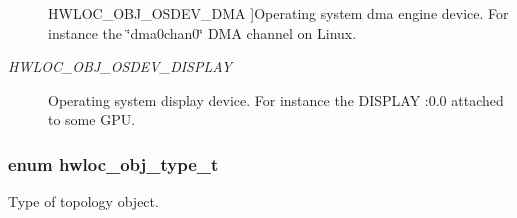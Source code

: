 \begin{Desc}
\begin{description}
{\hypertarget{a00041_gga64f5d539df299c97ae80ce53fc4b56c0a827ad1643360711a8b6c6af671366791}{
HWLOC\_\-OBJ\_\-OSDEV\_\-DMA}
\label{a00041_gga64f5d539df299c97ae80ce53fc4b56c0a827ad1643360711a8b6c6af671366791}
}]Operating system dma engine device. For instance the \char`\"{}dma0chan0\char`\"{} DMA channel on Linux. \item[{\em 
\hypertarget{a00041_gga64f5d539df299c97ae80ce53fc4b56c0a5da1cc266d3d288fdc639b0e800e9da4}{
HWLOC\_\-OBJ\_\-OSDEV\_\-DISPLAY}
\label{a00041_gga64f5d539df299c97ae80ce53fc4b56c0a5da1cc266d3d288fdc639b0e800e9da4}
}]Operating system display device. For instance the DISPLAY :0.0 attached to some GPU. \end{description}
\end{Desc}

\hypertarget{a00041_gacd37bb612667dc437d66bfb175a8dc55}{
\subsubsection[{hwloc\_\-obj\_\-type\_\-t}]{\setlength{\rightskip}{0pt plus 5cm}enum {\bf hwloc\_\-obj\_\-type\_\-t}}}
\label{a00041_gacd37bb612667dc437d66bfb175a8dc55}


Type of topology object. 

